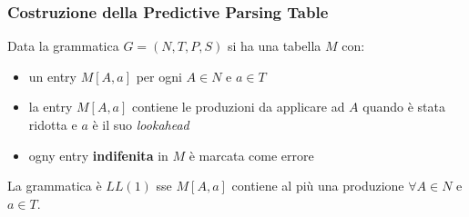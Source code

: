 \subsubsection{Costruzione della Predictive Parsing Table}
Data la grammatica $G=(N,T,P,S)$ si ha una tabella $M$ con:
\begin{itemize}
\item un entry $M[A,a]$ per ogni $A \in N$ e $a \in T$
\item la entry $M[A,a]$ contiene le produzioni da applicare ad $A$ quando \`e
stata ridotta e $a$ \`e il suo \textit{lookahead}
\item ogny entry \textbf{indifenita} in $M$ \`e marcata come errore
\end{itemize}

La grammatica \`e $LL(1)$ sse $M[A,a]$ contiene al pi\`u una produzione $\forall
A \in N$ e $a \in T$.

